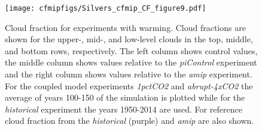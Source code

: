 \documentclass[draft]{agujournal2019}
\begin{document}

\begin{figure}
  \centering
  \texttt{[image: cfmipfigs/Silvers\_cfmip\_CF\_figure9.pdf]}
  \caption{Cloud fraction for experiments with warming.  Cloud fractions are shown for the upper-, mid-, and low-level 
  clouds in the top, middle, and bottom rows, respectively.  The left column shows control values, the middle column
  shows values relative to the \textit{piControl} experiment and the right column
  shows values relative to the \textit{amip} experiment.  For the coupled model experiments
 \textit{1pctCO2} and \textit{abrupt-4xCO2} the average of years 100-150 of the simulation is plotted while for the 
 \textit{historical} experiment the years 1950-2014 are used.  
  For reference cloud fraction from the 
 \textit{historical} (purple) and \textit{amip} are also shown.}
  \label{fig:CF_warming}
\end{figure}
\end{document}
